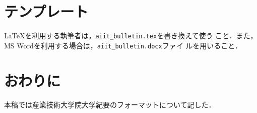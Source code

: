 \documentclass[a4j, 12Q, twocolumn, twoside]{jsarticle}
\begin{document}
\section{テンプレート}
\LaTeX を利用する執筆者は，\texttt{aiit\_bulletin.tex}を書き換えて使う
こと．また，MS Wordを利用する場合は，\texttt{aiit\_bulletin.docx}ファイ
ルを用いること．

\section{おわりに}
本稿では産業技術大学院大学紀要のフォーマットについて記した．



\end{document}
